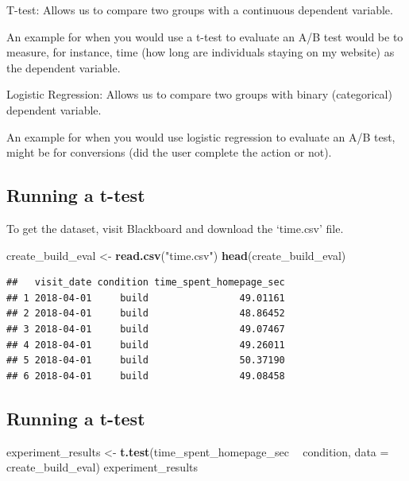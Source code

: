 \documentclass[]{article}
\newenvironment{Shaded}{\begin{snugshade}}{\end{snugshade}}
\newcommand{\KeywordTok}[1]{\textcolor[rgb]{0.13,0.29,0.53}{\textbf{#1}}}
\newcommand{\DataTypeTok}[1]{\textcolor[rgb]{0.13,0.29,0.53}{#1}}
\newcommand{\StringTok}[1]{\textcolor[rgb]{0.31,0.60,0.02}{#1}}
\newcommand{\OperatorTok}[1]{\textcolor[rgb]{0.81,0.36,0.00}{\textbf{#1}}}
\newcommand{\NormalTok}[1]{#1}
\begin{document}
T-test: Allows us to compare two groups with a continuous dependent
variable.

An example for when you would use a t-test to evaluate an A/B test would
be to measure, for instance, time (how long are individuals staying on
my website) as the dependent variable.

Logistic Regression: Allows us to compare two groups with binary
(categorical) dependent variable.

An example for when you would use logistic regression to evaluate an A/B
test, might be for conversions (did the user complete the action or
not).

\subsection{Running a t-test}\label{running-a-t-test}

To get the dataset, visit Blackboard and download the `time.csv' file.

\begin{Shaded}
\begin{Highlighting}[]
\NormalTok{create_build_eval <-}\StringTok{ }\KeywordTok{read.csv}\NormalTok{(}\StringTok{"time.csv"}\NormalTok{)}
\KeywordTok{head}\NormalTok{(create_build_eval)}
\end{Highlighting}
\end{Shaded}

\begin{verbatim}
##   visit_date condition time_spent_homepage_sec
## 1 2018-04-01     build                49.01161
## 2 2018-04-01     build                48.86452
## 3 2018-04-01     build                49.07467
## 4 2018-04-01     build                49.26011
## 5 2018-04-01     build                50.37190
## 6 2018-04-01     build                49.08458
\end{verbatim}

\subsection{Running a t-test}\label{running-a-t-test-1}

\begin{Shaded}
\begin{Highlighting}[]
\NormalTok{experiment_results <-}\StringTok{ }\KeywordTok{t.test}\NormalTok{(time_spent_homepage_sec }\OperatorTok{~}\StringTok{ }\NormalTok{condition, }\DataTypeTok{data =}\NormalTok{ create_build_eval)}
\NormalTok{experiment_results}
\end{Highlighting}
\end{Shaded}
\end{document}
